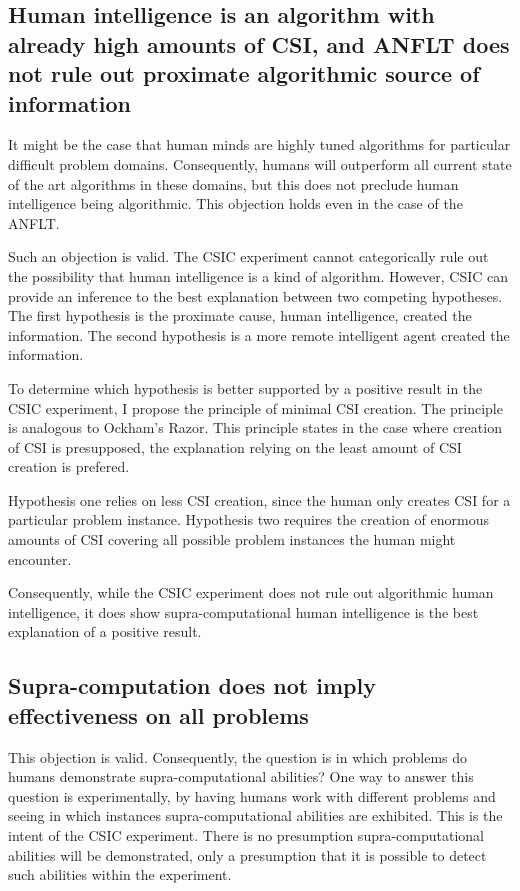 \subsection{Human intelligence is an algorithm with already high amounts of CSI, and ANFLT does not rule out proximate algorithmic source of information}

 It might be the case that human minds are highly tuned algorithms for particular difficult problem domains.  Consequently, humans will outperform all current state of the art algorithms in these domains, but this does not preclude human intelligence being algorithmic.  This objection holds even in the case of the ANFLT.

 Such an objection is valid.  The CSIC experiment cannot categorically rule out the possibility that human intelligence is a kind of algorithm.  However, CSIC can provide an inference to the best explanation between two competing hypotheses.  The first hypothesis is the proximate cause, human intelligence, created the information.  The second hypothesis is a more remote intelligent agent created the information.

To determine which hypothesis is better supported by a positive result in the CSIC experiment, I propose the principle of minimal CSI creation.  The principle is analogous to Ockham's Razor.  This principle states in the case where creation of CSI is presupposed, the explanation relying on the least amount of CSI creation is prefered.

 Hypothesis one relies on less CSI creation, since the human only creates CSI for a particular problem instance.  Hypothesis two requires the creation of enormous amounts of CSI covering all possible problem instances the human might encounter.

 Consequently, while the CSIC experiment does not rule out algorithmic human intelligence, it does show supra-computational human intelligence is the best explanation of a positive result. 

\subsection{Supra-computation does not imply effectiveness on all problems}
 This objection is valid.  Consequently, the question is in which problems do humans demonstrate supra-computational abilities?  One way to answer this question is experimentally, by having humans work with different problems and seeing in which instances supra-computational abilities are exhibited.  This is the intent of the CSIC experiment.  There is no presumption supra-computational abilities will be demonstrated, only a presumption that it is possible to detect such abilities within the experiment. 

